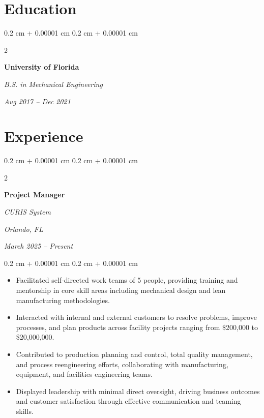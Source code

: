 \documentclass[10pt, letterpaper]{article}
\newenvironment{highlights}{
    \begin{itemize}[
        topsep=0.10 cm,
        parsep=0.10 cm,
        partopsep=0pt,
        itemsep=0pt,
        leftmargin=0.4 cm + 10pt
    ]
}{
    \end{itemize}
} %
\newenvironment{onecolentry}{
    \begin{adjustwidth}{
        0.2 cm + 0.00001 cm
    }{
        0.2 cm + 0.00001 cm
    }
}{
    \end{adjustwidth}
} %
\newenvironment{twocolentry}[2][]{
    \onecolentry
    \def\secondColumn{#2}
    \setcolumnwidth{\fill, 4.5 cm}
    \begin{paracol}{2}
}{
    \switchcolumn \raggedleft \secondColumn
    \end{paracol}
    \endonecolentry
} %
\begin{document}
        \vspace{0.3 cm}


    

    \section{Education}

\vspace{0.2 cm}
        
        \begin{twocolentry}{
            
            
        \textit{Aug 2017 – Dec 2021}}
            \textbf{University of Florida}
            
            \textit{B.S. in Mechanical Engineering}
        \end{twocolentry}

        \vspace{0.15 cm}
        

\vspace{0.3 cm}

    
    \section{Experience}

        \vspace{0.2 cm}

        \begin{twocolentry}{
        \textit{Orlando, FL}    
            
        \textit{March 2025 – Present}}
            \textbf{Project Manager}
            
            \textit{CURIS System}
        \end{twocolentry}

        \vspace{0.10 cm}
        \begin{onecolentry}
            \begin{highlights}
                \item Facilitated self-directed work teams of 5 people, providing training and mentorship in core skill areas including mechanical design and lean manufacturing methodologies.
                \item Interacted with internal and external customers to resolve problems, improve processes, and plan products across facility projects ranging from \$200,000 to \$20,000,000.
                \item Contributed to production planning and control, total quality management, and process reengineering efforts, collaborating with manufacturing, equipment, and facilities engineering teams.
                \item Displayed leadership with minimal direct oversight, driving business outcomes and customer satisfaction through effective communication and teaming skills.
            \end{highlights}
        \end{onecolentry}
\end{document}
